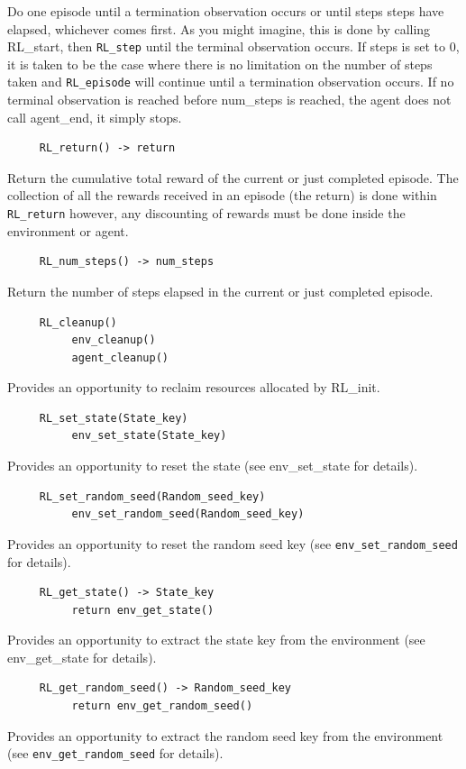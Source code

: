 \documentclass[11pt]{article}
\begin{document}
Do one episode until a termination observation occurs or until steps steps have elapsed, whichever comes first.  As you might imagine, this is done by calling RL\_start, then \texttt{RL\_step} until the terminal observation occurs.  If steps is set to 0, it is taken to be the case where there is no limitation on the number of steps taken and \texttt{RL\_episode} will continue until a termination observation occurs. If no terminal observation is reached before num\_steps is reached, the agent does not call agent\_end, it simply stops.
\begin{verbatim}
     RL_return() -> return
\end{verbatim}
Return the cumulative total reward of the current or just completed episode.  The collection of all the rewards received in an episode (the return) is done within \texttt{RL\_return} however, any discounting of rewards must be done inside the environment or agent.
\begin{verbatim}
     RL_num_steps() -> num_steps
\end{verbatim}
Return the number of steps elapsed in the current or just completed episode.
\begin{verbatim}
     RL_cleanup()
          env_cleanup()
          agent_cleanup()
\end{verbatim}
Provides an opportunity to reclaim resources allocated by RL\_init.
\begin{verbatim}
     RL_set_state(State_key)
          env_set_state(State_key)    
\end{verbatim}
Provides an opportunity to reset the state (see env\_set\_state for details).
\begin{verbatim}
     RL_set_random_seed(Random_seed_key)
          env_set_random_seed(Random_seed_key)
\end{verbatim}
Provides an opportunity to reset the random seed key (see \texttt{env\_set\_random\_seed} for details).
\begin{verbatim}
     RL_get_state() -> State_key
          return env_get_state()  
\end{verbatim}
Provides an opportunity to extract the state key from the environment (see env\_get\_state for details).
\begin{verbatim}
     RL_get_random_seed() -> Random_seed_key
          return env_get_random_seed()   
\end{verbatim}
Provides an opportunity to extract the random seed key from the environment (see \texttt{env\_get\_random\_seed} for details).               
\end{document}
